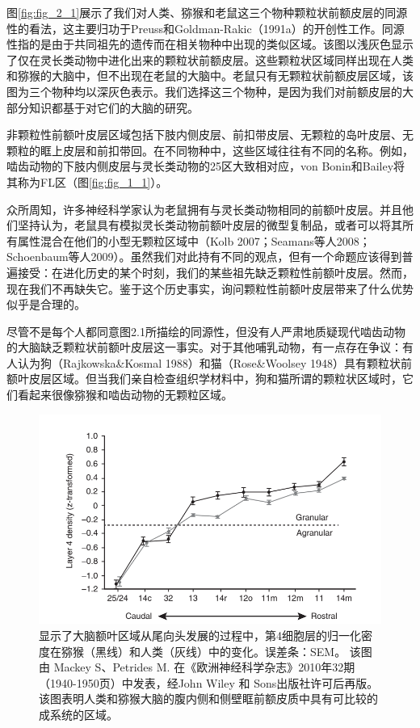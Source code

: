 图\ref{fig:fig_2_1}展示了我们对人类、猕猴和老鼠这三个物种颗粒状前额皮层的同源性的看法，这主要归功于Preuss和Goldman-Rakic（1991a）的开创性工作。同源性指的是由于共同祖先的遗传而在相关物种中出现的类似区域。该图以浅灰色显示了仅在灵长类动物中进化出来的颗粒状前额皮层。这些颗粒状区域同样出现在人类和猕猴的大脑中，但不出现在老鼠的大脑中。老鼠只有无颗粒状前额皮层区域，该图为三个物种均以深灰色表示。我们选择这三个物种，是因为我们对前额皮层的大部分知识都基于对它们的大脑的研究。

非颗粒性前额叶皮层区域包括下肢内侧皮层、前扣带皮层、无颗粒的岛叶皮层、无颗粒的眶上皮层和前扣带回。在不同物种中，这些区域往往有不同的名称。例如，啮齿动物的下肢内侧皮层与灵长类动物的25区大致相对应，von Bonin和Bailey将其称为FL区（图\ref{fig:fig_1_1}）。

众所周知，许多神经科学家认为老鼠拥有与灵长类动物相同的前额叶皮层。并且他们坚持认为，老鼠具有模拟灵长类动物前额叶皮层的微型复制品，或者可以将其所有属性混合在他们的小型无颗粒区域中（Kolb 2007；Seamans等人2008；Schoenbaum等人2009）。虽然我们对此持有不同的观点，但有一个命题应该得到普遍接受：在进化历史的某个时刻，我们的某些祖先缺乏颗粒性前额叶皮层。然而，现在我们不再缺失它。鉴于这个历史事实，询问颗粒性前额叶皮层带来了什么优势似乎是合理的。

尽管不是每个人都同意图2.1所描绘的同源性，但没有人严肃地质疑现代啮齿动物的大脑缺乏颗粒状前额叶皮层这一事实。对于其他哺乳动物，有一点存在争议：有人认为狗（Rajkowska\&Kosmal 1988）和猫（Rose\&Woolsey 1948）具有颗粒状前额叶皮层区域。但当我们亲自检查组织学材料中，狗和猫所谓的颗粒状区域时，它们看起来很像猕猴和啮齿动物的无颗粒区域。

\begin{figure}[!htb]
	\centering
	\includegraphics[width=0.8\linewidth]{image_pfc/Fig_2_2}
	\caption{显示了大脑额叶区域从尾向头发展的过程中，第4细胞层的归一化密度在猕猴（黑线）和人类（灰线）中的变化。误差条：SEM。
		该图由 Mackey S、Petrides M. 在《欧洲神经科学杂志》2010年32期（1940-1950页）中发表，经John Wiley 和 Sons出版社许可后再版。该图表明人类和猕猴大脑的腹内侧和侧壁眶前额皮质中具有可比较的成系统的区域。\label{fig:fig_2_2}}
\end{figure}

